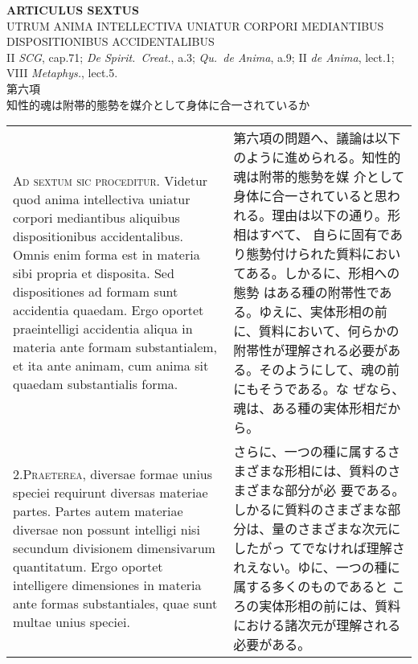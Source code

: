 \documentclass[paper=a4paper,fontsize=10pt,jafontsize=9pt,titlepage]{jlreq}
\begin{document}
\begin{center}
{\Large {\bfseries ARTICULUS SEXTUS}}\\
{\large UTRUM ANIMA INTELLECTIVA UNIATUR CORPORI MEDIANTIBUS DISPOSITIONIBUS ACCIDENTALIBUS}\\
{\footnotesize II {\itshape SCG}, cap.71; {\itshape De Spirit.~Creat.}, a.3; {\itshape Qu.~de Anima}, a.9; II {\itshape de Anima}, lect.1; VIII {\itshape Metaphys.}, lect.5.}\\
{\Large 第六項\\知性的魂は附帯的態勢を媒介として身体に合一されているか}
\end{center}

\begin{longtable}{p{21em}p{21em}}
{\scshape Ad sextum sic proceditur}. Videtur quod anima intellectiva
uniatur corpori mediantibus aliquibus dispositionibus
accidentalibus. Omnis enim forma est in materia sibi propria et
disposita. Sed dispositiones ad formam sunt accidentia quaedam. Ergo
oportet praeintelligi accidentia aliqua in materia ante formam
substantialem, et ita ante animam, cum anima sit quaedam substantialis
forma.

&

第六項の問題へ、議論は以下のように進められる。知性的魂は附帯的態勢を媒
介として身体に合一されていると思われる。理由は以下の通り。形相はすべて、
自らに固有であり態勢付けられた質料においてある。しかるに、形相への態勢
はある種の附帯性である。ゆえに、実体形相の前に、質料において、何らかの
附帯性が理解される必要がある。そのようにして、魂の前にもそうである。な
ぜなら、魂は、ある種の実体形相だから。
 
\\



2.{\scshape Praeterea}, diversae formae unius speciei requirunt
diversas materiae partes. Partes autem materiae diversae non possunt
intelligi nisi secundum divisionem dimensivarum quantitatum. Ergo
oportet intelligere dimensiones in materia ante formas substantiales,
quae sunt multae unius speciei.

&

 さらに、一つの種に属するさまざまな形相には、質料のさまざまな部分が必
 要である。しかるに質料のさまざまな部分は、量のさまざまな次元にしたがっ
 てでなければ理解されえない。ゆに、一つの種に属する多くのものであると
 ころの実体形相の前には、質料における諸次元が理解される必要がある。
 
\\




\end{longtable}
\end{document}
